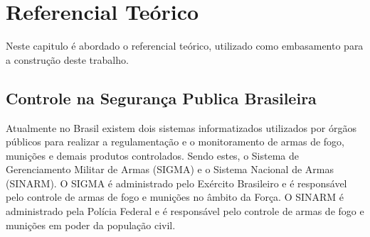 
 
\chapter{Referencial Teórico}\label{referecial_teorico}

Neste capitulo é abordado o referencial teórico, utilizado como embasamento para a construção deste trabalho.
\section{ Controle na Segurança Publica Brasileira }
Atualmente no Brasil existem dois sistemas informatizados utilizados por órgãos públicos para realizar a regulamentação e o monitoramento de armas de fogo, munições e demais produtos controlados.
Sendo estes, o Sistema de Gerenciamento Militar de Armas (SIGMA) e o Sistema Nacional de Armas (SINARM). O SIGMA é administrado pelo Exército Brasileiro e é responsável pelo controle de armas de fogo e munições no âmbito da Força. O SINARM é administrado pela Polícia Federal e é responsável pelo controle de armas de fogo e munições em poder da população civil\cite{shotEntendaSinarm}.

